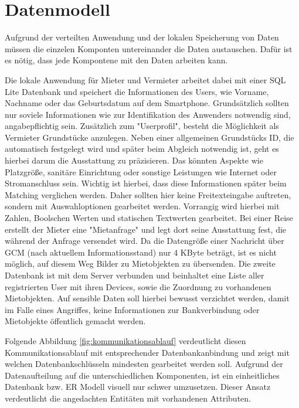 
\section{Datenmodell}

Aufgrund der verteilten Anwendung und der lokalen Speicherung von Daten müssen die einzelen Komponten untereinander die Daten austauschen. Dafür ist es nötig, dass jede Kompontene mit den Daten arbeiten kann.

Die lokale Anwendung für Mieter und Vermieter arbeitet dabei mit einer SQL Lite Datenbank und speichert die Informationen des Users, wie Vorname, Nachname oder das Geburtsdatum auf dem Smartphone. Grundsätzlich sollten nur soviele Informationen wie zur Identifikation des Anwenders notwendig sind, angabepflichtig sein. Zusätzlich zum "Userprofil", besteht die Möglichkeit als Vermieter Grundstücke anzulegen. Neben einer allgemeinen Grundstücks ID, die automatisch festgelegt wird und später beim Abgleich notwendig ist, geht es hierbei darum die Ausstattung zu präzisieren. 
Das könnten Aspekte wie Platzgröße, sanitäre Einrichtung oder sonstige Leistungen wie Internet oder Stromanschluss sein. Wichtig ist hierbei, dass diese Informationen später beim Matching verglichen werden. Daher sollten hier keine Freitexteingabe auftreten, sondern mit Auswahloptionen gearbeitet werden. Vorrangig wird hierbei mit Zahlen, Boolschen Werten und statischen Textwerten gearbeitet. Bei einer Reise erstellt der Mieter eine "Mietanfrage" und legt dort seine Ausstattung fest, die während der Anfrage versendet wird. Da die Datengröße einer Nachricht über GCM (nach aktuellem Informationsstand) nur 4 KByte beträgt, ist es nicht möglich, auf diesem Weg Bilder zu Mietobjekten zu übersenden. 
Die zweite Datenbank ist mit dem Server verbunden und beinhaltet eine Liste aller registrierten User mit ihren Devices, sowie die Zuordnung zu vorhandenen Mietobjekten. Auf sensible Daten soll hierbei bewusst verzichtet werden, damit im Falle eines Angriffes, keine Informationen zur Bankverbindung oder Mietobjekte öffentlich gemacht werden.

Folgende Abbildung \ref{fig:kommunikationsablauf} verdeutlicht diesen Kommunikationsablauf mit entsprechender Datenbankanbindung und zeigt mit welchen Datenbankschlüsseln mindesten gearbeitet werden soll.
Aufgrund der Datenaufteilung auf die unterschiedlichen Komponenten, ist ein einheitliches Datenbank bzw. ER Modell visuell nur schwer umzusetzen. Dieser Ansatz verdeutlicht die angedachten Entitäten mit vorhandenen Attributen.

